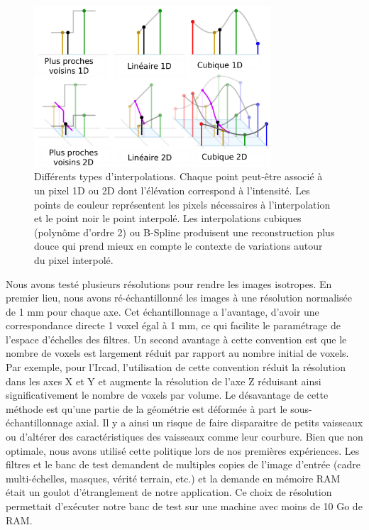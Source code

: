 \begin{figure}[!ht]
  \centering
  \includegraphics[height=6cm]{Images/Interpolation.png}
  \caption{Différents types d'interpolations. Chaque point peut-être associé à un pixel 1D ou 2D dont l'élévation correspond à l'intensité. Les points de couleur représentent les pixels nécessaires à l'interpolation et le point noir le point interpolé. Les interpolations cubiques (polynôme d'ordre 2) ou B-Spline produisent une reconstruction plus douce qui prend mieux en compte le contexte de variations autour du pixel interpolé.\protect \footnotemark}
  \label{fig:interpolation}
\end{figure}

Nous avons testé plusieurs résolutions pour rendre les images isotropes. En premier lieu, nous avons ré-échantillonné les images à une résolution normalisée de 1 mm pour chaque axe. Cet échantillonnage a l'avantage, d'avoir une correspondance directe 1 voxel égal à 1 mm, ce qui facilite le paramétrage de l'espace d'échelles des filtres. Un second avantage à cette convention est que le nombre de voxels est largement réduit par rapport au nombre initial de voxels.
Par exemple, pour l'Ircad, l'utilisation de cette convention  réduit la résolution dans les axes X et Y et augmente la résolution de l'axe Z réduisant ainsi significativement le nombre de voxels par volume. Le désavantage de cette méthode est qu'une partie de la géométrie est déformée à part le sous-échantillonnage axial. Il y a ainsi un risque de faire disparaitre de petits vaisseaux ou d'altérer des caractéristiques des vaisseaux comme leur courbure.  Bien que non optimale, nous avons utilisé cette politique lors de nos premières expériences. Les filtres et le banc de test demandent de multiples copies de l'image d'entrée (cadre multi-échelles, masques, vérité terrain, etc.) et la demande en mémoire RAM était un goulot d'étranglement de notre application. Ce choix de résolution permettait d'exécuter notre banc de test sur une machine avec moins de 10 Go de RAM.

